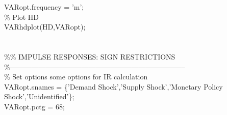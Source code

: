 \hspace{1mm}\hspace{5mm} \hspace{5mm} VARopt.frequency = \textcolor{matlabpurple}{'m'}; \\ 
\hspace{1mm}\hspace{5mm} \hspace{5mm} \textcolor{matlabgreen}{\% Plot HD }\\ 
\hspace{1mm}\hspace{5mm} \hspace{5mm} VARhdplot(HD,VARopt); \\ 
\hspace{1mm}\hspace{5mm} \hspace{5mm}  \\ 
\hspace{1mm}\hspace{5mm} \hspace{5mm}  \\ 
\hspace{1mm}\hspace{5mm} \hspace{5mm} \textcolor{matlabgreen}{\%}\textcolor{matlabgreen}{\% IMPULSE RESPONSES: SIGN RESTRICTIONS }\\ 
\hspace{1mm}\hspace{5mm} \hspace{5mm} \textcolor{matlabgreen}{\%--------------------------------------------------------------------------  }\\ 
\hspace{1mm}\hspace{5mm} \hspace{5mm} \textcolor{matlabgreen}{\% Set options some options \textcolor{matlabblue}{for} IR calculation }\\ 
\hspace{1mm}\hspace{5mm} \hspace{5mm} \hspace{5mm} VARopt.snames = \{\textcolor{matlabpurple}{'Demand Shock'},\textcolor{matlabpurple}{'Supply Shock'},\textcolor{matlabpurple}{'Monetary Policy Shock'},\textcolor{matlabpurple}{'Unidentified'}\}; \\ 
\hspace{1mm}\hspace{5mm} \hspace{5mm} \hspace{5mm} VARopt.pctg = 68; \\ 
